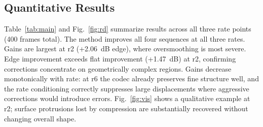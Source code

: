 \documentclass[conference]{IEEEtran}
\begin{document}
\subsection{Quantitative Results}

Table~\ref{tab:main} and Fig.~\ref{fig:rd} summarize results across all three
rate points (400 frames total). The method improves all four sequences at all
three rates. Gains are largest at r2 (+2.06~dB edge), where oversmoothing is
most severe. Edge improvement exceeds flat improvement (+1.47~dB) at r2,
confirming corrections concentrate on geometrically complex regions.
Gains decrease monotonically with rate: at r6 the codec already preserves fine
structure well, and the rate conditioning correctly suppresses large
displacements where aggressive corrections would introduce errors.
Fig.~\ref{fig:vis} shows a qualitative example at r2; surface protrusions lost
by compression are substantially recovered without changing overall shape.
\end{document}
